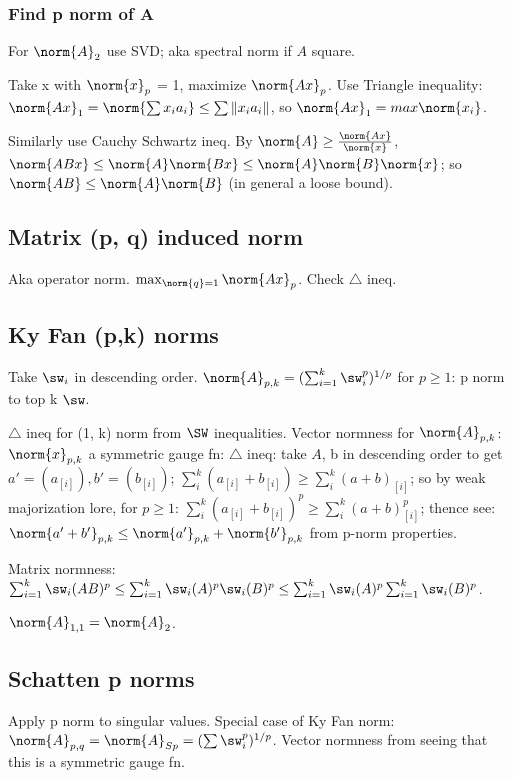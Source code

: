 \documentclass[oneside, article]{memoir}
\begin{document}
\subsubsection{Find p norm of A}
For $\norm{A}_{2}$ use SVD; aka spectral norm if $A$ square.

Take x with $\norm{x}_{p}$ = 1, maximize $\norm{Ax}_{p}$. Use Triangle inequality: $\norm{Ax}_{1} = \norm{\sum x_{i}a_{i}}\\ \leq \sum \|x_{i}a_{i}\|$, so $\norm{Ax}_{1} = max \norm{x_{i}}$.

Similarly use Cauchy Schwartz ineq. By $\norm{A} \geq \frac{\norm{Ax}}{\norm{x}}$, \\
$\norm{ABx} \leq \norm{A}\norm{Bx} \leq \norm{A}\norm{B} \norm{x}$; so $\norm{AB} \leq \norm{A}\norm{B}$ (in general a loose bound).

\subsection{Matrix (p, q) induced norm}
Aka operator norm. $\max_{\norm{q} = 1} \norm{Ax}_{p}$. Check $\triangle$ ineq.

\subsection{Ky Fan (p,k) norms}
Take $\sw_{i}$ in descending order. $\norm{A}_{p,k} = (\sum_{i=1}^{k}\sw_{i}^{p})^{1/p}$ for $p\geq 1$: p norm to top k $\sw$.

$\triangle$ ineq for (1, k) norm from $\SW$ inequalities. Vector normness for $\norm{A}_{p,k}$: $\norm{x}_{p,k}$ a symmetric gauge fn: $\triangle$ ineq: take $A$, b in descending order to get $a' = (a_{[i]}), b' = (b_{[i]})$; $\sum_{i}^{k} (a_{[i]} + b_{[i]}) \geq \sum_{i}^{k}(a+b)_{[i]}$; so by weak majorization lore, for $p \geq 1$: $\sum_{i}^{k} (a_{[i]} + b_{[i]})^{p} \geq \sum_{i}^{k}(a+b)_{[i]}^{p}$; thence see: $\norm{a' + b'}_{p,k} \leq \norm{a'}_{p,k} + \norm{b'}_{p,k}$ from p-norm properties.

Matrix normness:\\
$\sum_{i=1}^{k}\sw_{i}(AB)^{p} \leq \sum_{i=1}^{k}\sw_{i}(A)^{p}\sw_{i}(B)^{p}\leq \sum_{i=1}^{k}\sw_{i}(A)^{p}\sum_{i=1}^{k}\sw_{i}(B)^{p}$.

$\norm{A}_{1,1} = \norm{A}_{2}$.

\subsection{Schatten p norms}
Apply p norm to singular values. Special case of Ky Fan norm: $\norm{A}_{p,q}  = \norm{A}_{Sp} = (\sum \sw_{i}^{p})^{1/p}$. Vector normness from seeing that this is a symmetric gauge fn.
\end{document}
